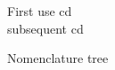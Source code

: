 \documentclass{article}
\begin{document}
\noindent
First use \gls{cd}\\
subsequent \gls{cd}

Nomenclature \gls{tree}

\printnoidxglossaries
\end{document}

